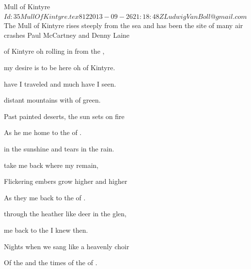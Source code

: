 \begin{SBSong}{Mull of Kintyre}
  {$Id: 35MullOfKintyre.tex 812 2013-09-26 21:18:48Z LudwigVanBoll@gmail.com $}
  {The Mull of Kintyre rises steeply from the sea and has been the site of many air crashes}
  {Paul McCartney and Denny Laine}
  \begin{SBChorus}
     of Kintyre oh  rolling in from the ,

    my desire is  to be here oh  of Kintyre.
  \end{SBChorus}
  \begin{SBVerse}
     have I traveled and much have I seen.

     distant mountains with  of green.

    Past painted deserts, the sun sets on fire

    As he  me home to the  of .
  \end{SBVerse}
  \begin{SBVerse}
     in the sunshine and tears in the rain.

     take me back where my  remain,

    Flickering embers grow higher and higher

    As they  me back to the  of .
  \end{SBVerse}
  \begin{SBVerse}
     through the heather like deer in the glen,

     me back to the  I knew then.

    Nights when we sang like a heavenly choir

    Of the  and the times of the  of .
  \end{SBVerse}
\end{SBSong}
